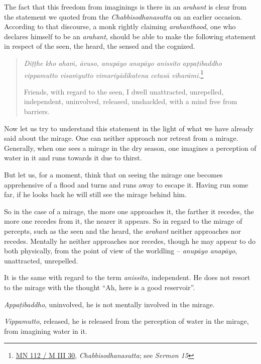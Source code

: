 \enlargethispage{\baselineskip}

The fact that this freedom from imaginings is there in an \emph{arahant} is clear from the statement we quoted from the \emph{Chabbisodhanasutta} on an earlier occasion. According to that discourse, a monk rightly claiming \emph{arahanthood}, one who declares himself to be an \emph{arahant}, should be able to make the following statement in respect of the seen, the heard, the sensed and the cognized.

\begin{quote}
\emph{Diṭṭhe kho ahaṁ, āvuso, anupāyo anapāyo anissito appaṭibaddho vippamutto visaṁyutto vimariyādikatena cetasā viharāmi.}\footnote{\href{https://suttacentral.net/mn112/pli/ms}{MN 112 / M III 30}, \emph{Chabbisodhanasutta}; see \emph{Sermon 15}}

Friends, with regard to the seen, I dwell unattracted, unrepelled, independent, uninvolved, released, unshackled, with a mind free from barriers.
\end{quote}

Now let us try to understand this statement in the light of what we have already said about the mirage. One can neither approach nor retreat from a mirage. Generally, when one sees a mirage in the dry season, one imagines a perception of water in it and runs towards it due to thirst.

But let us, for a moment, think that on seeing the mirage one becomes apprehensive of a flood and turns and runs away to escape it. Having run some far, if he looks back he will still see the mirage behind him.

So in the case of a mirage, the more one approaches it, the farther it recedes, the more one recedes from it, the nearer it appears. So in regard to the mirage of percepts, such as the seen and the heard, the \emph{arahant} neither approaches nor recedes. Mentally he neither approaches nor recedes, though he may appear to do both physically, from the point of view of the worldling -- \emph{anupāyo anapāyo}, unattracted, unrepelled.

It is the same with regard to the term \emph{anissito}, independent. He does not resort to the mirage with the thought ``Ah, here is a good reservoir''.

\emph{Appaṭibaddho}, uninvolved, he is not mentally involved in the mirage.

\emph{Vippamutto}, released, he is released from the perception of water in the mirage, from imagining water in it.

